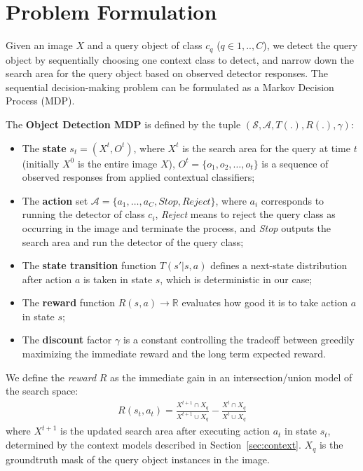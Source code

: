\section{Problem Formulation}
Given an image $X$ and a query object of class $c_q$ ($q \in {1,..,C}$), we detect
the query object by sequentially choosing one
context class to detect, and narrow down the search area for the query object based on
observed detector responses. 
The sequential decision-making problem can be formulated as a Markov Decision
Process (MDP).
\begin{mydef}
The \textbf{Object Detection MDP} is defined by the tuple $(\mathcal{S}, \mathcal{A}, T(.), R(.), \gamma)$:
\begin{itemize}
\item The \textbf{state} $s_t=(X^t, O^t)$, where $X^t$ is the search area for the
query at time $t$ (initially $X^0$ is the entire image $X$), $O^t= \{o_1, o_2,
\dots, o_t\}$ is a sequence of observed responses from applied contextual
classifiers;
\item The \textbf{action} set $\mathcal{A} = \{a_1, \dots, a_C, Stop,
Reject\}$, where $a_i$ corresponds to running the detector of class
$c_i$, \textit{Reject} means to reject the query class as occurring in the
image and terminate the process, and \textit{Stop} outputs the search area
and run the detector of the query class;
\item The \textbf{state transition} function $T(s'|s,a)$ defines a
next-state distribution after action $a$ is taken in state $s$, which is deterministic in our case;
\item The \textbf{reward} function $R(s,a) \rightarrow \mathbb{R}$ evaluates
how good it is to take action $a$ in state $s$;
\item The \textbf{discount} factor $\gamma$ is a constant controlling
the tradeoff between greedily maximizing the immediate
reward and the long term expected reward.
\end{itemize}
\end{mydef}

We define the \textit{reward} $R$ as the immediate gain in an intersection/union model of the search space:
\begin{eqnarray}
\label{eq:imreward}
R(s_t,a_t) =  \frac{X^{t+1} \cap X_q}{X^{t+1} \cup X_q} - \frac{X^{t}\cap X_q}{X^{t} \cup X_q}
\end{eqnarray}
where $X^{t+1}$ is the updated search area after executing action $a_t$ in state $s_t$, determined by the context models described in Section~\ref{sec:context}. $X_q$ is the groundtruth mask of the query object instances in the image. 

